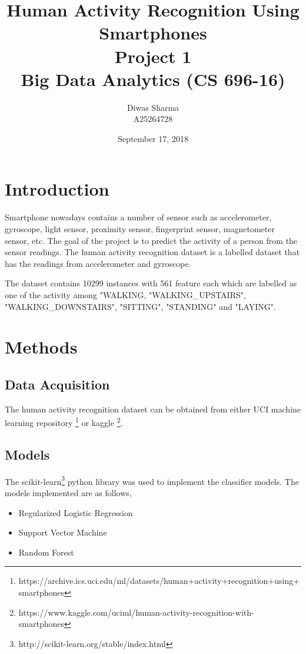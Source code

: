 \documentclass[12pt]{article}
\title{Human Activity Recognition Using Smartphones \\ \normalsize Project 1 \\ \small Big Data Analytics (CS 696-16)}
\author{Diwas Sharma \\ A25264728}
\date{September 17, 2018}
\begin{document}
\maketitle
\newpage

\tableofcontents
\newpage

\section{Introduction}
Smartphone nowadays contains a number of sensor such as accelerometer, gyroscope, light sensor, proximity sensor, fingerprint sensor, magnetometer sensor, etc. The goal of the project
is to predict the activity of a person from the sensor readings. The human activity recognition dataset\cite{anguita2013public} is a labelled dataset that has the readings from accelerometer
and gyroscope.

The dataset contains 10299 instances with 561 feature each which are labelled as one of the activity among "WALKING, "WALKING\_UPSTAIRS", "WALKING\_DOWNSTAIRS", "SITTING", "STANDING" and "LAYING".

\section{Methods}

\subsection{Data Acquisition}
The human activity recognition dataset can be obtained from either UCI machine learning repository \footnote{https://archive.ics.uci.edu/ml/datasets/human+activity+recognition+using+smartphones}
or kaggle \footnote{https://www.kaggle.com/uciml/human-activity-recognition-with-smartphones}.

\subsection{Models}
The scikit-learn\footnote{http://scikit-learn.org/stable/index.html} python library was used to implement the classifier models. The models implemented are as follows,

\begin{itemize}
    \item Regularized Logistic Regression \cite{hosmer2013applied}
    \item Support Vector Machine \cite{cortes1995support}
    \item Random Forest \cite{liaw2002classification}
\end{itemize}
\end{document}
